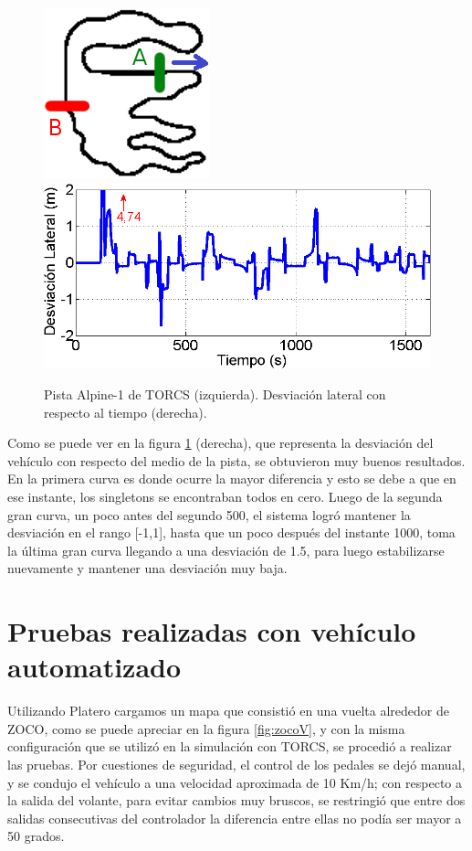 \begin{figure}[htb]
\centering
\includegraphics[width=0.2\linewidth]{figures/alpine.PNG}\hspace{0.02\linewidth}\includegraphics[width=0.6\linewidth]{figures/desvTorcs.png}
\caption{Pista Alpine-1 de TORCS (izquierda). Desviación lateral con respecto al tiempo (derecha).}
\label{fig:alpine}
\end{figure}

Como se puede ver en la figura \ref{fig:alpine} (derecha), que representa la desviación del vehículo con respecto del medio de la pista, se obtuvieron muy buenos resultados. En la primera curva es donde ocurre la mayor diferencia y esto se debe a que en ese instante, los singletons se encontraban todos en cero. Luego de la segunda gran curva, un poco antes del segundo 500, el sistema logró mantener la desviación en el rango [-1,1], hasta que un poco después del instante 1000, toma la última gran curva llegando a una desviación de 1.5, para luego estabilizarse nuevamente y mantener una desviación muy baja.


\section{Pruebas realizadas con vehículo automatizado} 

Utilizando Platero cargamos un mapa que consistió en una vuelta alrededor de \gls{ZOCO}, como se puede apreciar en la figura \ref{fig:zocoV}, y con la misma configuración que se utilizó en la simulación con \gls{TORCS}, se procedió a realizar las pruebas. Por cuestiones de seguridad, el control de los pedales se dejó manual, y se condujo el vehículo a una velocidad aproximada de 10 Km/h; con respecto a la salida del volante, para evitar cambios muy bruscos, se restringió que entre dos salidas consecutivas del controlador la diferencia entre ellas no podía ser mayor a 50 grados.

